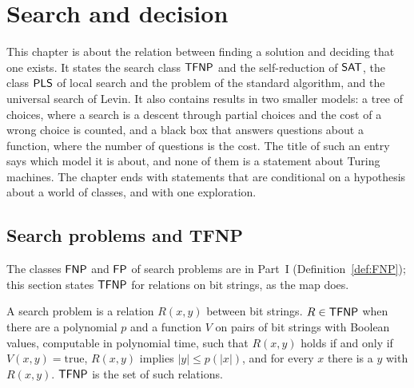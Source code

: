 \chapter{Search and decision}
\label{chap:search}

This chapter is about the relation between finding a solution and deciding that one exists. It
states the search class $\mathsf{TFNP}$ and the self-reduction of $\mathsf{SAT}$, the class $\mathsf{PLS}$ of local
search and the problem of the standard algorithm, and the universal search of Levin. It also
contains results in two smaller models: a tree of choices, where a search is a descent through
partial choices and the cost of a wrong choice is counted, and a black box that answers questions
about a function, where the number of questions is the cost. The title of such an entry says
which model it is about, and none of them is a statement about Turing machines. The chapter ends
with statements that are conditional on a hypothesis about a world of classes, and with one
exploration.

\section{Search problems and TFNP}
\label{sec:search-tfnp}

The classes $\mathsf{FNP}$ and $\mathsf{FP}$ of search problems are in Part~I (Definition~\ref{def:FNP}); this
section states $\mathsf{TFNP}$ for relations on bit strings, as the map does.

\begin{definition}
  \label{def:search-tfnp}
  \leanok
  A search problem is a relation $R(x, y)$ between bit strings. $R \in \mathsf{TFNP}$ when there are a
  polynomial $p$ and a function $V$ on pairs of bit strings with Boolean values, computable in
  polynomial time, such that $R(x, y)$ holds if and only if $V(x, y) = \mathrm{true}$, $R(x, y)$
  implies $|y| \le p(|x|)$, and for every $x$ there is a $y$ with $R(x, y)$. $\mathsf{TFNP}$ is the set of
  such relations.
\end{definition}

